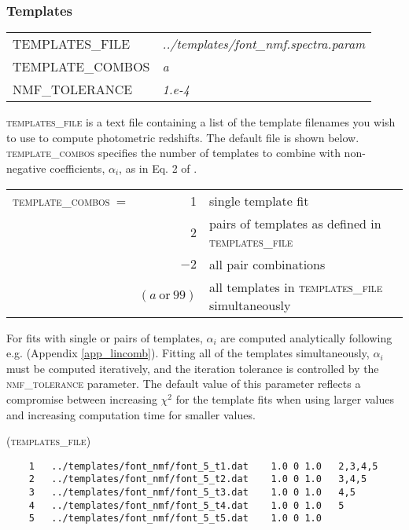 \documentclass[11pt]{article}
\begin{document}

\subsubsection{Templates} \label{s:template_params}
\begin{tabular}{ll}
 \textsc{TEMPLATES\_FILE} & \textsl{       ../templates/font\_nmf.spectra.param } \\
 \textsc{TEMPLATE\_COMBOS } & \textsl{     a                } \\
 \textsc{NMF\_TOLERANCE} & \textsl{        1.e-4           } \\
\end{tabular}
\vspace*{0.5cm}

\textsc{templates\_file} is a text file containing a list of the template
filenames you wish to use to compute photometric redshifts.  The default file
is shown below.  \textsc{template\_combos} specifies the number of templates to
combine with non-negative coefficients, $\alpha_i$, as in Eq. 2 of \cite{eazy_paper}.  

\vspace*{0.25cm}
\begin{tabular}{lrl}
 \textsc{template\_combos}\ =&1 &  \textrm{single template fit} \\
 &2 & \textrm{pairs of templates as defined in \textsc{templates\_file}}\\
 & $-2$ & \textrm{all pair combinations} \\
 &$(a\ \mathrm{or}\ 99)$ &  \textrm{all templates in \textsc{templates\_file} simultaneously}
\end{tabular}

\vspace*{0.25cm} For fits with single or pairs of templates, $\alpha_i$ are
computed analytically following e.g. \cite{bevington} (Appendix
\ref{app_lincomb}).  Fitting all of the templates simultaneously, $\alpha_i$
must be computed iteratively, and the iteration tolerance is controlled by the
\textsc{nmf\_tolerance} parameter.  The default value of this parameter
reflects a compromise between increasing $\chi^2$ for the template fits when
using larger values and increasing computation time for smaller values.

\vspace*{0.25cm}\textsc{(templates\_file)}\vspace*{-0.4cm}
\begin{verbatim}
    1   ../templates/font_nmf/font_5_t1.dat    1.0 0 1.0   2,3,4,5
    2   ../templates/font_nmf/font_5_t2.dat    1.0 0 1.0   3,4,5
    3   ../templates/font_nmf/font_5_t3.dat    1.0 0 1.0   4,5
    4   ../templates/font_nmf/font_5_t4.dat    1.0 0 1.0   5
    5   ../templates/font_nmf/font_5_t5.dat    1.0 0 1.0   
\end{verbatim}
\end{document}
